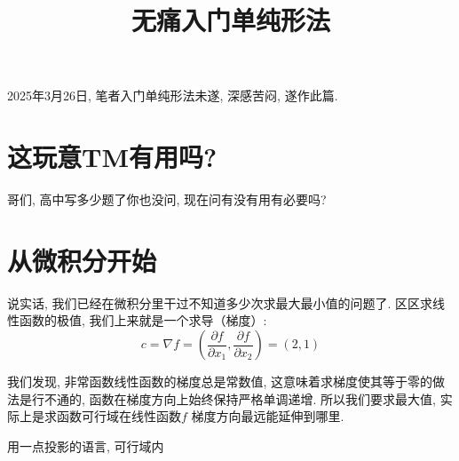 \documentclass{article}
\title{无痛入门单纯形法}
\begin{document}
\maketitle

2025年3月26日, 笔者入门单纯形法未遂, 深感苦闷, 遂作此篇.

\section{这玩意TM有用吗?}
哥们, 高中写多少题了你也没问, 现在问有没有用有必要吗?

\section{从微积分开始}

说实话, 我们已经在微积分里干过不知道多少次求最大最小值的问题了. 区区求线性函数的极值, 我们上来就是一个求导（梯度）:
\[
    c = \nabla f =\left( \frac{\partial f}{\partial x_1},
    \frac{\partial f}{\partial x_2} \right) = (2,1)
\]

我们发现, 非常函数线性函数的梯度总是常数值, 这意味着求梯度使其等于零的做法是行不通的,
函数在梯度方向上始终保持严格单调递增. 所以我们要求最大值, 实际上是求函数可行域在线性函数\(f\) 梯度方向最远能延伸到哪里.

用一点投影的语言, 可行域内
\end{document}

